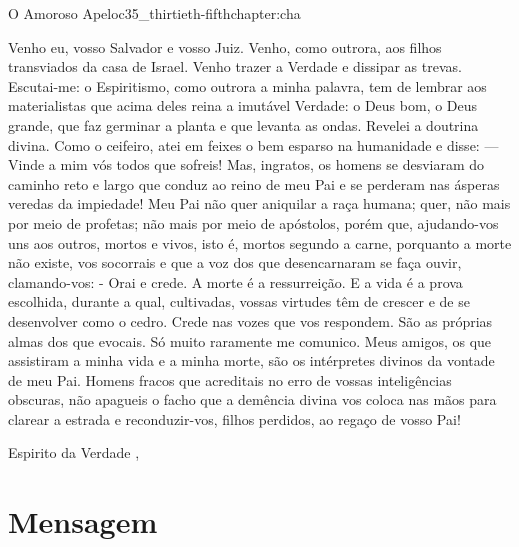 \begin{chapterpage}{O Amoroso Apelo}{c35_thirtieth-fifthchapter:cha}

\begin{myquotation}Venho eu, vosso Salvador e vosso Juiz. Venho, como outrora, aos filhos transviados da casa de Israel. Venho trazer a Verdade e dissipar as trevas. Escutai-me: o Espiritismo, como outrora a minha palavra, tem de lembrar aos materialistas que acima deles reina a imutável Verdade: o Deus bom, o Deus grande, que faz germinar a planta e que levanta as ondas.  Revelei a doutrina divina. Como o ceifeiro, atei em  feixes o bem esparso na humanidade e disse: — Vinde a mim vós todos que sofreis!  Mas, ingratos, os homens se desviaram do caminho reto e largo que conduz ao reino de meu Pai e se perderam nas ásperas veredas da impiedade! Meu Pai não quer aniquilar a raça humana; quer, não mais por meio de profetas; não mais por meio de apóstolos, porém que, ajudando-vos uns aos outros, mortos e vivos, isto é, mortos segundo a carne, porquanto a morte não existe, vos socorrais e que a voz dos que desencarnaram se faça ouvir, clamando-vos: - Orai e crede. A morte é a ressurreição. E a vida é a prova escolhida, durante a qual, cultivadas, vossas virtudes têm de crescer e de se desenvolver como o cedro. Crede nas vozes que vos respondem. São as próprias almas dos que evocais.  Só muito raramente me comunico. Meus amigos, os que assistiram a minha vida e a minha morte, são os intérpretes divinos da vontade de meu Pai. Homens fracos que acreditais no erro de vossas inteligências obscuras, não apagueis o facho que a demência divina vos coloca nas mãos para clarear a estrada e reconduzir-vos, filhos perdidos, ao regaço de vosso Pai! 
\par\vspace*{15mm}
\mbox{}\hfill \emdash{}Espirito da Verdade
, %
\par\end{myquotation}

\end{chapterpage}



\section{Mensagem}\label{c1_basicformatting:sec}

